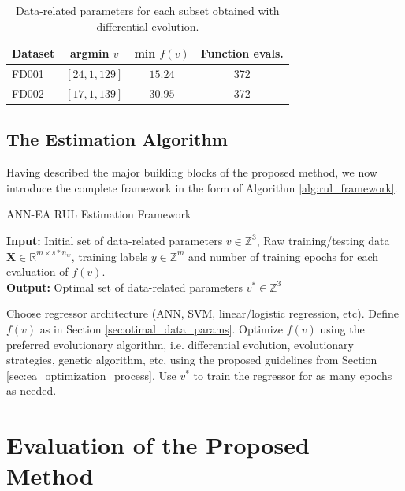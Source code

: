 \documentclass[preprint,12pt]{elsarticle}%
\begin{document}
\begin{table}[!htb]
\begin{center}
\begin{tabular}[c]{l|crr}\hline
Dataset & argmin $v$ & min $f(v)$ & Function evals.\\\hline
FD001 & $\left[  24,1,129\right]  $ & \multicolumn{1}{c}{$15.24$} & \multicolumn{1}{c}{372}\\
FD002 & $\left[  17,1,139\right]  $ & \multicolumn{1}{c}{$30.95$} & \multicolumn{1}{c}{372}\\\hline
\end{tabular}
\caption{Data-related parameters for each subset obtained with differential evolution.}
\label{table:optimal_data_params}
\end{center}
\end{table}

\subsection{The Estimation Algorithm}

Having described the major building blocks of the proposed method, we now
introduce the complete framework in the form of Algorithm \ref{alg:rul_framework}.

\setcounter{algorithm}{0} 
\begin{algorithm}[!htb]
\caption{\newline ANN-EA RUL Estimation Framework}\label{alg:rul_framework}
\textbf{Input:} Initial set of data-related parameters $v \in \mathbb{Z}^3$, 
Raw training/testing data $\mathbf{X} \in \mathbb{R}^{m \times s*n_w} $, training labels $y \in \mathbb{Z}^m$ and number of training epochs for each evaluation of $f(v)$.\\
\textbf{Output:} Optimal set of data-related parameters $v^* \in \mathbb{Z}^3$
\begin{algorithmic}[1]
\State Choose regressor architecture (ANN, SVM, linear/logistic regression, etc).
\State Define $f(v)$ as in Section \ref{sec:otimal_data_params}.
\State Optimize $f(v)$ using the preferred evolutionary algorithm, i.e. 
differential evolution, evolutionary strategies, genetic algorithm, etc, using the proposed 
guidelines from Section \ref{sec:ea_optimization_process}.
\State Use $v^*$ to train the regressor for as many epochs as needed.
\end{algorithmic}
\end{algorithm}


\section{Evaluation of the Proposed Method}
\end{document}
